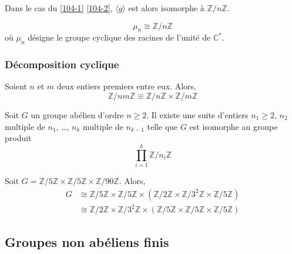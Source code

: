 
  \begin{proposition}
    Dans le cas du \cref{104-1} \cref{104-2}, $\langle g \rangle$ est alors isomorphe à $\mathbb{Z}/n\mathbb{Z}$.
  \end{proposition}

  \begin{example}
    \[ \mu_n \cong \mathbb{Z}/n\mathbb{Z} \]
    où $\mu_n$ désigne le groupe cyclique des racines de l'unité de $\mathbb{C}^*$.
  \end{example}

  \subsubsection{Décomposition cyclique}


  \begin{theorem}[Chinois]
    Soient $n$ et $m$ deux entiers premiers entre eux. Alors,
    \[ \mathbb{Z}/nm\mathbb{Z} \equiv \mathbb{Z}/n\mathbb{Z} \times \mathbb{Z}/m\mathbb{Z} \]
  \end{theorem}


  \begin{theorem}[Kronecker]
    Soit $G$ un groupe abélien d'ordre $n \geq 2$. Il existe une suite d'entiers $n_1 \geq 2$, $n_2$ multiple de $n_1$, \dots, $n_k$ multiple de $n_{k-1}$ telle que $G$ est isomorphe au groupe produit
    \[ \prod_{i=1}^k \mathbb{Z}/n_i\mathbb{Z} \]
  \end{theorem}

  \begin{example}
    Soit $G = \mathbb{Z}/5\mathbb{Z} \times \mathbb{Z}/5\mathbb{Z} \times \mathbb{Z}/90\mathbb{Z}$. Alors,
    \begin{align*}
      G &\cong \mathbb{Z}/5\mathbb{Z} \times \mathbb{Z}/5\mathbb{Z} \times (\mathbb{Z}/2\mathbb{Z} \times \mathbb{Z}/3^2\mathbb{Z} \times \mathbb{Z}/5\mathbb{Z}) \\
      &\cong \mathbb{Z}/2\mathbb{Z} \times \mathbb{Z}/3^2\mathbb{Z} \times (\mathbb{Z}/5\mathbb{Z} \times \mathbb{Z}/5\mathbb{Z} \times \mathbb{Z}/5\mathbb{Z})
    \end{align*}
  \end{example}

  \subsection{Groupes non abéliens finis}

